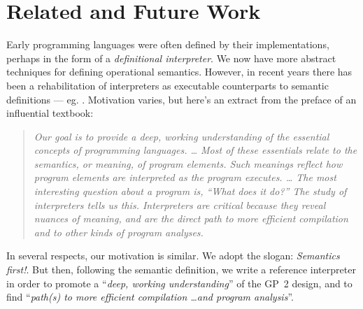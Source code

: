\section{Related and Future Work}
\label{sec:relatedandfuture}

Early programming languages were often defined by their implementations,
perhaps in the form of a \emph{definitional interpreter}.
We now have more abstract techniques for defining operational semantics.
However, in recent years there has been a 
rehabilitation of interpreters as executable counterparts to semantic
definitions --- eg. \cite{Campbell2012}. 
Motivation varies, but here's an extract from the preface
of an influential textbook: 

\pagebreak

\begin{quote}
\textit{Our goal is to provide a deep, working understanding of the essential concepts of programming languages. \ldots
Most of these essentials relate to the semantics, or meaning, of program elements. Such meanings reflect how program elements are interpreted as the program executes. \ldots
The most interesting question about a program is, \textnormal{``What does it do?''} The study of interpreters tells us this. Interpreters are critical because they reveal nuances of meaning, and are the direct path to more efficient compilation and to other kinds of program analyses.} \cite{Friedmanetal2008}
\end{quote}
In several respects, our motivation is similar.
We adopt the slogan: \emph{Semantics first!}.
But then, following the semantic definition, we write a reference interpreter in order to
promote a ``\textit{deep, working understanding}'' of the GP~2 design,
and to find ``\textit{path(s) to more efficient compilation \ldots and program analysis}''.

